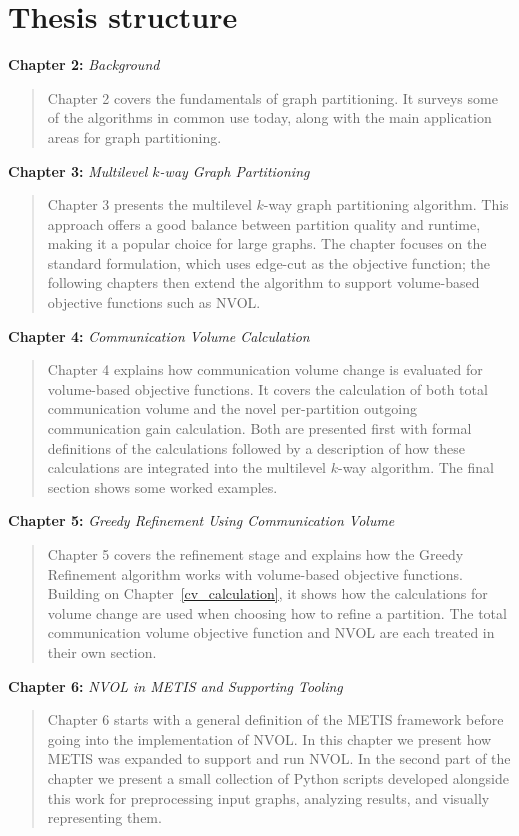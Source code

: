 \section{Thesis structure}
\textbf{Chapter 2:} \textit{Background}
\begin{quote}
	Chapter 2 covers the fundamentals of graph partitioning. It surveys some of the algorithms in common use today, along with the main application areas for graph partitioning.
\end{quote}
\textbf{Chapter 3:} \textit{Multilevel $k$-way Graph Partitioning}
\begin{quote}
	Chapter 3 presents the multilevel $k$-way graph partitioning algorithm. This approach offers a good balance between partition quality and runtime, making it a popular choice for large graphs. The chapter focuses on the standard formulation, which uses edge-cut as the objective function; the following chapters then extend the algorithm to support volume-based objective functions such as NVOL.
\end{quote}
\textbf{Chapter 4:} \textit{Communication Volume Calculation}
\begin{quote}
	Chapter 4 explains how communication volume change is evaluated for volume-based objective functions. It covers the calculation of both total communication volume and the novel per-partition outgoing communication gain calculation. Both are presented first with formal definitions of the calculations followed by a description of how these calculations are integrated into the multilevel $k$-way algorithm. The final section shows some worked examples.
\end{quote}
\textbf{Chapter 5:} \textit{Greedy Refinement Using Communication Volume}
\begin{quote}
	Chapter 5 covers the refinement stage and explains how the Greedy Refinement algorithm works with volume-based objective functions. Building on Chapter~\ref{cv_calculation}, it shows how the calculations for volume change are used when choosing how to refine a partition. The total communication volume objective function and NVOL are each treated in their own section.
\end{quote}
\textbf{Chapter 6:} \textit{NVOL in METIS and Supporting Tooling}
\begin{quote}
	Chapter 6 starts with a general definition of the METIS framework before going into the implementation of NVOL. In this chapter we present how METIS was expanded to support and run NVOL. In the second part of the chapter we present a small collection of Python scripts developed alongside this work for preprocessing input graphs, analyzing results, and visually representing them. 
\end{quote}
